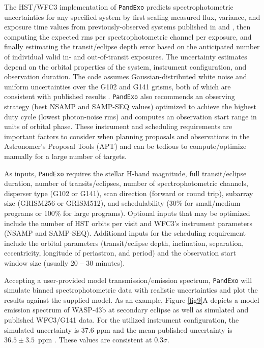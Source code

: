 \documentclass[iop]{emulateapj}
\begin{document}
The HST/WFC3 implementation of \texttt{PandExo} predicts spectrophotometric uncertainties for any specified system by first scaling measured flux, variance, and exposure time values from previously-observed systems published in \citet{Kreidberg2014a} and \citet{kre14}, then computing the expected rms per spectrophotometric channel per exposure, and finally estimating the transit/eclipse depth error based on the anticipated number of individual valid in- and out-of-transit exposures.  The uncertainty estimates depend on the orbital properties of the system, instrument configuration, and observation duration.  The code assumes Gaussian-distributed white noise and uniform uncertainties over the G102 and G141 grisms, both of which are consistent with published results \citep[e.g.][]{Kreidberg2014a, kre14, Stevenson2014c}.  \texttt{PandExo} also recommends an observing strategy (best NSAMP and SAMP-SEQ values) optimized to achieve the highest duty cycle (lowest photon-noise rms) and computes an observation start range in units of orbital phase.  These instrument and scheduling requirements are important factors to consider when planning proposals and observations in the Astronomer's Proposal Tools (APT) and can be tedious to compute/optimize manually for a large number of targets.

As inputs, \texttt{PandExo} requires the stellar H-band magnitude, full transit/eclipse duration, number of transits/eclipses, number of spectrophotometric channels, disperser type (G102 or G141), scan direction (forward or round trip), subarray size (GRISM256 or GRISM512), and schedulability (30\% for small/medium programs or 100\% for large programs).  Optional inputs that may be optimized include the number of HST orbits per visit and WFC3's instrument parameters (NSAMP and SAMP-SEQ).  Additional inputs for the scheduling requirement include the orbital parameters (transit/eclipse depth, inclination, separation, eccentricity, longitude of periastron, and period) and the observation start window size (usually 20 -- 30 minutes).

Accepting a user-provided model transmission/emission spectrum, \texttt{PandExo} will simulate binned spectrophotometric data with realistic uncertainties and plot the results against the supplied model.  As an example, Figure \ref{fig9}A depicts a model emission spectrum of WASP-43b at secondary eclipse as well as simulated and published WFC3/G141 data.  For the utilized instrument configuration, the simulated uncertainty is 37.6 ppm and the mean published uncertainty is $36.5 {\pm} 3.5$~ppm \citep{Stevenson2014c}.  These values are consistent at 0.3$\sigma$.
\end{document}
